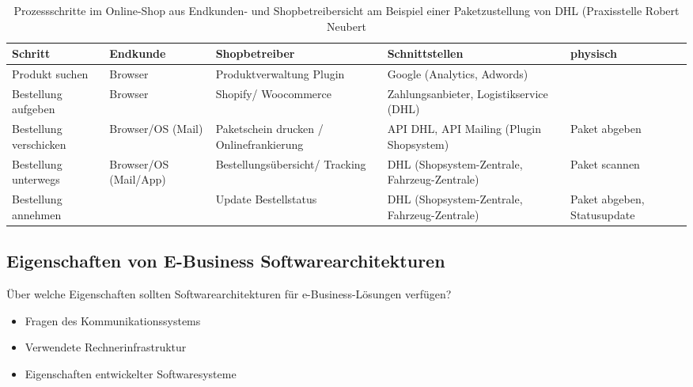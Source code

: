 \documentclass[notitlepage, hidelinks]{article}
\begin{document}
\begin{table}[H]
\centering
\begin{tabular}{|L{2cm}|L{2.8cm}|L{2.8cm}|L{2.8cm}|L{2.8cm}|}
\hline
Schritt & Endkunde & Shopbetreiber & Schnittstellen & physisch \\ \hline
Produkt suchen & Browser & Produktverwaltung Plugin & Google (Analytics, Adwords) & \\ \hline
Bestellung aufgeben & Browser & Shopify/ Woocommerce & Zahlungsanbieter, Logistikservice (DHL) & \\ \hline
Bestellung verschicken & Browser/OS (Mail) & Paketschein drucken / Onlinefrankierung & API DHL, API Mailing (Plugin Shopsystem) & Paket abgeben \\ \hline
Bestellung unterwegs & Browser/OS (Mail/App) & Bestellungsübersicht/ Tracking & DHL (Shopsystem-Zentrale, Fahrzeug-Zentrale) & Paket scannen \\ \hline
Bestellung annehmen & & Update Bestellstatus & DHL (Shopsystem-Zentrale, Fahrzeug-Zentrale) & Paket abgeben, Statusupdate \\ \hline
\end{tabular}
\caption{Prozessschritte im Online-Shop aus Endkunden- und Shopbetreibersicht am Beispiel einer Paketzustellung von DHL (Praxisstelle Robert Neubert}
\end{table}

\subsection{Eigenschaften von E-Business Softwarearchitekturen}
Über welche Eigenschaften sollten Softwarearchitekturen für e-Business-Lösungen verfügen?
\begin{itemize}
\item Fragen des Kommunikationssystems
\item Verwendete Rechnerinfrastruktur
\item Eigenschaften entwickelter Softwaresysteme
\end{itemize}
\end{document}
